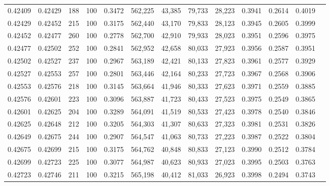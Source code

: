 \begin{tabular}{rrrrrrrrrrrrr}
0.42409 & 0.42429 &   188 & 100 &                                     0.3472 & 562,225 &  43,385 &  79,733 &  28,223 & 0.3941 & 0.2614 & 0.4019 \\
0.42429 & 0.42452 &   215 & 100 &                                     0.3175 & 562,440 &  43,170 &  79,833 &  28,123 & 0.3945 & 0.2605 & 0.3999 \\
0.42452 & 0.42477 &   260 & 100 &                                     0.2778 & 562,700 &  42,910 &  79,933 &  28,023 & 0.3951 & 0.2596 & 0.3975 \\
0.42477 & 0.42502 &   252 & 100 &                                     0.2841 & 562,952 &  42,658 &  80,033 &  27,923 & 0.3956 & 0.2587 & 0.3951 \\
0.42502 & 0.42527 &   237 & 100 &                                     0.2967 & 563,189 &  42,421 &  80,133 &  27,823 & 0.3961 & 0.2577 & 0.3929 \\
0.42527 & 0.42553 &   257 & 100 &                                     0.2801 & 563,446 &  42,164 &  80,233 &  27,723 & 0.3967 & 0.2568 & 0.3906 \\
0.42553 & 0.42576 &   218 & 100 &                                     0.3145 & 563,664 &  41,946 &  80,333 &  27,623 & 0.3971 & 0.2559 & 0.3885 \\
0.42576 & 0.42601 &   223 & 100 &                                     0.3096 & 563,887 &  41,723 &  80,433 &  27,523 & 0.3975 & 0.2549 & 0.3865 \\
0.42601 & 0.42625 &   204 & 100 &                                     0.3289 & 564,091 &  41,519 &  80,533 &  27,423 & 0.3978 & 0.2540 & 0.3846 \\
0.42625 & 0.42648 &   212 & 100 &                                     0.3205 & 564,303 &  41,307 &  80,633 &  27,323 & 0.3981 & 0.2531 & 0.3826 \\
0.42649 & 0.42675 &   244 & 100 &                                     0.2907 & 564,547 &  41,063 &  80,733 &  27,223 & 0.3987 & 0.2522 & 0.3804 \\
0.42675 & 0.42699 &   215 & 100 &                                     0.3175 & 564,762 &  40,848 &  80,833 &  27,123 & 0.3990 & 0.2512 & 0.3784 \\
0.42699 & 0.42723 &   225 & 100 &                                     0.3077 & 564,987 &  40,623 &  80,933 &  27,023 & 0.3995 & 0.2503 & 0.3763 \\
0.42723 & 0.42746 &   211 & 100 &                                     0.3215 & 565,198 &  40,412 &  81,033 &  26,923 & 0.3998 & 0.2494 & 0.3743 \\

\end{tabular}
